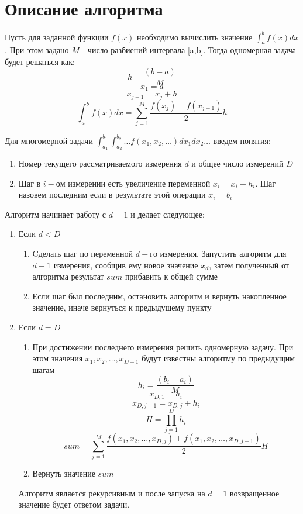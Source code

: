 \documentclass{report}
\begin{document}
\section*{Описание алгоритма}
\par Пусть для заданной функции $f(x)$ необходимо вычислить значение $\int_{a}^b f(x)dx$. При этом задано $M$ - число разбиений интервала [{a,b}]. Тогда одномерная задача будет решаться как:
$$ h = \frac{(b-a)}{M} $$
$$ x_{1} = a $$
$$ x_{j+1} = x_{j} + h $$
$$\int_{a}^b f(x)dx = \sum_{j=1}^M \frac{f(x_{j}) + f(x_{j-1})}{2}h$$

\par Для многомерной задачи $\int_{a_{1}}^{b_{1}}\int_{a_{2}}^{b_{2}} \ldots f(x_{1}, x_{2}, \ldots)dx_{1}dx_{2}\ldots$ введем понятия:
\begin{enumerate}
  \item Номер текущего рассматриваемого измерения $d$ и общее число измерений $D$
  \item Шаг в $i-ом$ измерении есть увеличение переменной $x_{i} = x_{i} + h_{i}$. Шаг назовем последним если в результате этой операции $x_{i} = b_{i}$
\end{enumerate}
\par Алгоритм начинает работу с $d=1$ и делает следующее:
\begin{enumerate}
  \item Если  $d < D$
    \begin{enumerate}
          \item Cделать шаг по переменной $d-го$ измерения. Запустить алгоритм для $d+1$ измерения, сообщив ему новое значение $x_{d}$, затем полученный от алгоритма результат $sum$ прибавить к общей сумме
          \item Если шаг был последним, остановить алгоритм и вернуть накопленное значение, иначе вернуться к предыдущему пункту
    \end{enumerate}
  \item Если $ d = D$
  \begin{enumerate}
      \item При достижении последнего измерения решить одномерную задачу. При этом значения $x_{1}, x_{2}, \ldots , x_{D-1} $ будут известны алгоритму по предыдущим шагам
      $$ h_{i} = \frac{(b_{i}-a_{i})}{M} $$
      $$ x_{D, 1} = a_{i} $$
      $$ x_{D, j+1} = x_{D, j} + h_{i} $$
      $$ H = \prod_{j=1}^D h_{i} $$
      $$ sum = \sum_{j=1}^M \frac{f(x_{1}, x_{2}, \ldots , x_{D, j}) + f(x_{1}, x_{2}, \ldots , x_{D, j-1})}{2}H$$
      \item Вернуть значение $ sum $ 
  \end{enumerate}
  \par Алгоритм является рекурсивным и после запуска на $d = 1$ возвращенное значение будет ответом задачи.
\end{enumerate}
\end{document}
